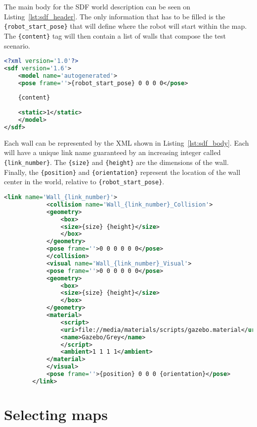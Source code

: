 The main body for the SDF world description can be seen on Listing~\ref{lst:sdf_header}. The only information that has to be filled is the \texttt{\{robot\_start\_pose\}} that will define where the robot will start within the map. The \texttt{\{content\}} tag will then contain a list of walls that compose the test scenario.

\begin{lstlisting}[caption={SDF Header.},label={lst:sdf_header},language=XML]
<?xml version='1.0'?>
<sdf version='1.6'>
    <model name='autogenerated'>
    <pose frame=''>{robot_start_pose} 0 0 0 0</pose>
    
    {content}
    
    <static>1</static>
    </model>
</sdf>
\end{lstlisting} \label{lst:1}

Each wall can be represented by the XML shown in Listing~\ref{lst:sdf_body}. Each will have a unique link name guaranteed by an increasing integer called \texttt{\{link\_number\}}. The \texttt{\{size\}} and \texttt{\{height\}} are the dimensions of the wall. Finally, the \texttt{\{position\}} and \texttt{\{orientation\}} represent the location of the wall center in the world, relative to \texttt{\{robot\_start\_pose\}}.

\begin{lstlisting}[caption={SDF for a single wall.},label={lst:sdf_body},language=XML]
        <link name='Wall_{link_number}'>
            <collision name='Wall_{link_number}_Collision'>
            <geometry>
                <box>
                <size>{size} {height}</size>
                </box>
            </geometry>
            <pose frame=''>0 0 0 0 0 0</pose>
            </collision>
            <visual name='Wall_{link_number}_Visual'>
            <pose frame=''>0 0 0 0 0 0</pose>
            <geometry>
                <box>
                <size>{size} {height}</size>
                </box>
            </geometry>
            <material>
                <script>
                <uri>file://media/materials/scripts/gazebo.material</uri>
                <name>Gazebo/Grey</name>
                </script>
                <ambient>1 1 1 1</ambient>
            </material>
            </visual>
            <pose frame=''>{position} 0 0 0 {orientation}</pose>
        </link>
\end{lstlisting}

\section{Selecting maps}

